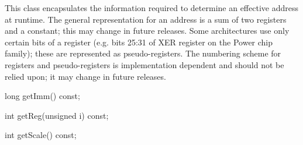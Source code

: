 
This class encapsulates the information required to determine an
effective address at runtime. The general
representation for an address is a sum of two registers and a
constant; this may change in future releases. Some
architectures use only certain bits of a register (e.g. bits 25:31 of
XER register on the Power chip family); these are
represented as pseudo-registers. The numbering scheme for registers
and pseudo-registers is implementation dependent
and should not be relied upon; it may change in future releases.

\begin{apient}
  long getImm() const;
\end{apient}


\begin{apient}
  int getReg(unsigned i) const;
\end{apient}


\begin{apient}
  int getScale() const;
\end{apient}

